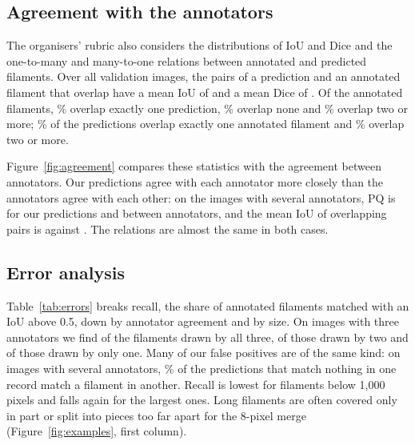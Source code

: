\documentclass[sigconf,nonacm]{acmart}
\begin{document}
\subsection{Agreement with the annotators}
    The organisers' rubric also considers the distributions of IoU and Dice and the one-to-many and many-to-one relations between annotated and predicted filaments. Over all validation images, the pairs of a prediction and an annotated filament that overlap have a mean IoU of \agIoU{} and a mean Dice of \agDice{}. Of the annotated filaments, \agTruthOne\% overlap exactly one prediction, \agTruthNone\% overlap none and \agTruthMany\% overlap two or more; \agPredOne\% of the predictions overlap exactly one annotated filament and \agPredMany\% overlap two or more.

    Figure~\ref{fig:agreement} compares these statistics with the agreement between annotators. Our predictions agree with each annotator more closely than the annotators agree with each other: on the images with several annotators, PQ is \multiPQ{} for our predictions and \annPQ{} between annotators, and the mean IoU of overlapping pairs is \multiIoU{} against \annIoU{}. The relations are almost the same in both cases.

\subsection{Error analysis}
    Table~\ref{tab:errors} breaks recall, the share of annotated filaments matched with an IoU above 0.5, down by annotator agreement and by size. On images with three annotators we find \consThreeR{} of the filaments drawn by all three, \consTwoR{} of those drawn by two and \consOneR{} of those drawn by only one. Many of our false positives are of the same kind: on images with several annotators, \fpOther\% of the predictions that match nothing in one record match a filament in another. Recall is lowest for filaments below 1,000 pixels and falls again for the largest ones. Long filaments are often covered only in part or split into pieces too far apart for the 8-pixel merge (Figure~\ref{fig:examples}, first column).
\end{document}
